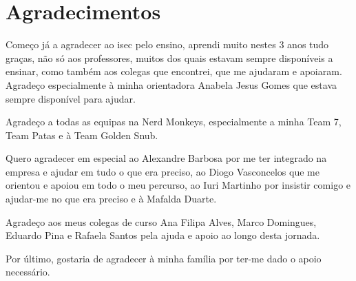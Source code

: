 \section*{Agradecimentos}

Começo já a agradecer ao \acrfull{isec} pelo ensino, aprendi muito nestes 3 anos
tudo graças, não só aos professores, muitos dos quais estavam sempre
disponíveis a ensinar, como também aos colegas que encontrei, que me
ajudaram e apoiaram.
Agradeço especialmente à minha orientadora Anabela Jesus Gomes que estava sempre disponível para ajudar.

Agradeço a todas as equipas na Nerd Monkeys, especialmente a minha Team
7, Team Patas e à Team Golden Snub.

Quero agradecer em especial ao Alexandre Barbosa por me ter integrado na
empresa e ajudar em tudo o que era preciso, ao Diogo Vasconcelos que
me orientou e apoiou em todo o meu percurso, ao Iuri Martinho por
insistir comigo e ajudar-me no que era preciso e à Mafalda Duarte.

Agradeço aos meus colegas de curso Ana Filipa Alves, Marco Domingues,
Eduardo Pina e Rafaela Santos pela ajuda e apoio ao longo desta jornada.

Por último, gostaria de agradecer à minha família por ter-me dado o apoio necessário.



